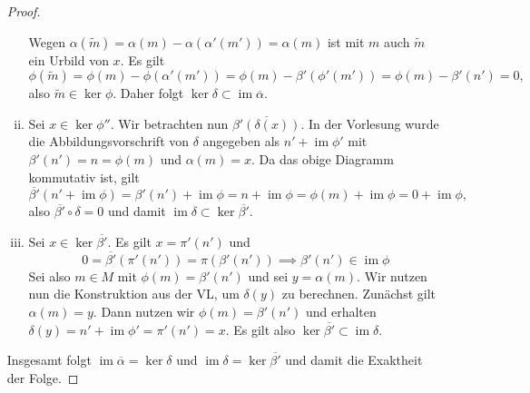 \documentclass{article}
\newcommand{\im}{\operatorname{im}}
\begin{document}
\begin{enumerate}[(a)]
\begin{proof}
\begin{enumerate}[(i)]
            Wegen $\alpha(\tilde m) = \alpha(m) - \alpha(\alpha'(m')) = \alpha(m)$ ist mit $m$ auch $\tilde m$ ein Urbild von $x$.
            Es gilt 
            $$\phi(\tilde m) = \phi(m) - \phi(\alpha'(m')) = \phi(m) - \beta'(\phi'(m')) = \phi(m) - \beta'(n') = 0,$$
            also $\tilde m \in \ker \phi$.
            Daher folgt $\ker \delta \subset \im \overline{\alpha}$.
            \item Sei $x \in \ker \phi''$. Wir betrachten nun $\overline{\beta'(\delta(x))}$. In der Vorlesung wurde die Abbildungsvorschrift von $\delta$
            angegeben als $n' + \im \phi'$ mit $\beta'(n') = n = \phi(m)$ und $\alpha(m) = x$. 
            Da das obige Diagramm kommutativ ist, gilt 
            \[ 
                \overline{\beta'}(n' + \im \phi) = \beta'(n') + \im \phi = n + \im \phi = \phi(m) + \im \phi = 0 + \im \phi,
            \]
            also $\overline{\beta'}\circ \delta = 0$ und damit $\im \delta \subset \ker \overline{\beta'}$.
            \item Sei $x \in \ker \overline{\beta'}$. Es gilt $x = \pi'(n')$ und 
            $$0 = \overline{\beta'}(\pi'(n')) = \pi(\beta'(n')) \implies \beta'(n') \in \im \phi$$
            Sei also $m\in M$ mit $\phi(m) = \beta'(n')$ und sei $y = \alpha(m)$.
            Wir nutzen nun die Konstruktion aus der VL, um $\delta(y)$ zu berechnen. Zunächst gilt $\alpha(m) = y$. 
            Dann nutzen wir $\phi(m) = \beta'(n')$ und erhalten $\delta(y) = n' + \im \phi' = \pi'(n') = x$. 
            Es gilt also $\ker \overline{\beta'} \subset \im \delta$.
        \end{enumerate}
        Insgesamt folgt $\im \overline{\alpha} = \ker \delta$ und $\im \delta = \ker \overline{\beta'}$ und damit die Exaktheit der Folge.
    \end{proof}
\end{enumerate}
\end{document}

